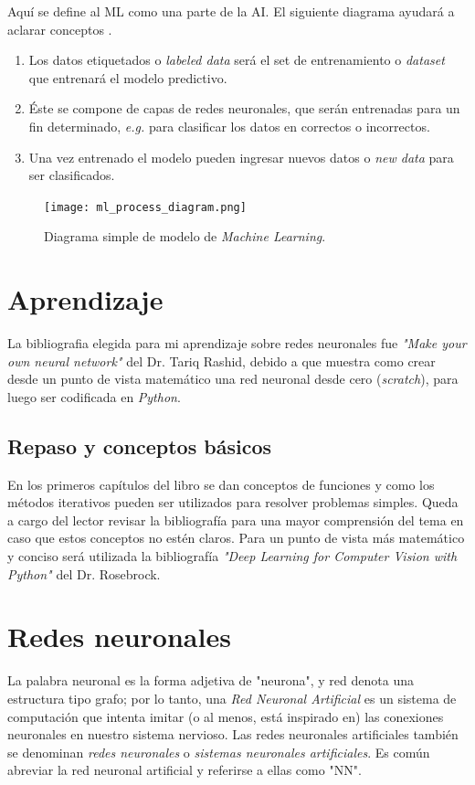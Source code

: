 \documentclass[14.5pt,a4paper]{article}
\begin{document}
Aquí se define al ML como una parte de la AI. El siguiente diagrama ayudará a aclarar conceptos \cite{advancedmachinelearningprocess}.

\begin{enumerate}

\item Los datos etiquetados o \textit{labeled data} será el set de entrenamiento o \textit{dataset} que entrenará el modelo predictivo. 
\item Éste se compone de capas de redes neuronales, que serán entrenadas para un fin determinado, \textit{e.g.} para clasificar los datos en correctos o incorrectos.
\item Una vez entrenado el modelo pueden ingresar nuevos datos o \textit{new data} para ser clasificados.
\end{enumerate}

\begin{figure}[H]
	\begin{center}				
	\texttt{[image: ml\_process\_diagram.png]}
  	\caption{Diagrama simple de modelo de \textit{Machine Learning}.}
  	\end{center}
\end{figure}

\section{Aprendizaje}
La bibliografia elegida para mi aprendizaje sobre redes neuronales fue \textit{"Make your own neural network"} \cite{rashid2016make} del Dr. Tariq Rashid, debido a que muestra como crear desde un punto de vista matemático una red neuronal desde cero (\textit{scratch}), para luego ser codificada en \textit{Python}.

\subsection{Repaso y conceptos básicos}
En los primeros capítulos del libro se dan conceptos de funciones y como los métodos iterativos pueden ser utilizados para resolver problemas simples. Queda a cargo del lector revisar la bibliografía para una mayor comprensión del tema en caso que estos conceptos no estén claros. 
Para un punto de vista más matemático y conciso será utilizada la bibliografía \textit{"Deep Learning for Computer Vision with Python"} \cite{rosebrock2017deep} del Dr. Rosebrock.

\section{Redes neuronales}
La palabra neuronal es la forma adjetiva de "neurona", y red denota una estructura tipo grafo; por lo tanto, una \textit{Red Neuronal Artificial} es un sistema de computación que intenta imitar (o al menos, está inspirado en) las conexiones neuronales en nuestro sistema nervioso. Las redes neuronales artificiales también se denominan \textit{redes neuronales} o \textit{sistemas neuronales artificiales}. Es común abreviar la red neuronal artificial y referirse a ellas como "NN".
\end{document}

